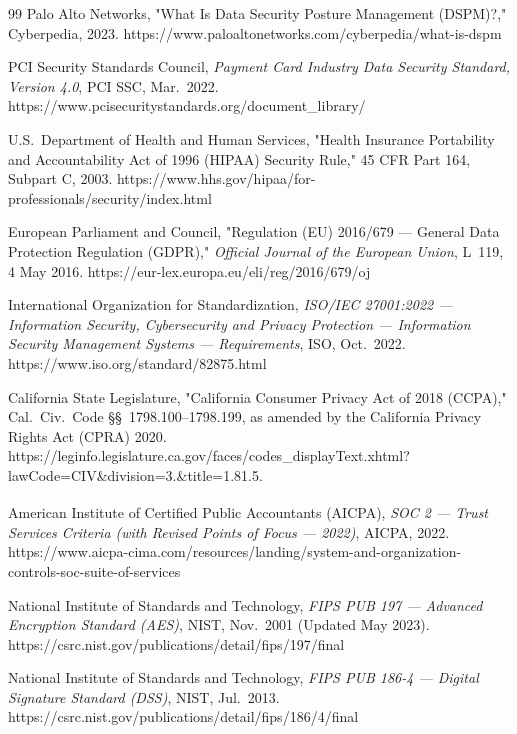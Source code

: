 \documentclass[12pt,a4paper]{report}
\begin{document}
\begin{thebibliography}{99}
Palo Alto Networks, "What Is Data Security Posture Management (DSPM)?," Cyberpedia, 2023. https://www.paloaltonetworks.com/cyberpedia/what-is-dspm


PCI Security Standards Council, \textit{Payment Card Industry Data Security Standard, Version 4.0}, PCI SSC, Mar.\ 2022. https://www.pcisecuritystandards.org/document\_library/

U.S.\ Department of Health and Human Services, "Health Insurance Portability and Accountability Act of 1996 (HIPAA) Security Rule," 45 CFR Part 164, Subpart C, 2003. https://www.hhs.gov/hipaa/for-professionals/security/index.html

European Parliament and Council, "Regulation (EU) 2016/679 --- General Data Protection Regulation (GDPR)," \textit{Official Journal of the European Union}, L~119, 4 May 2016. https://eur-lex.europa.eu/eli/reg/2016/679/oj

International Organization for Standardization, \textit{ISO/IEC 27001:2022 --- Information Security, Cybersecurity and Privacy Protection --- Information Security Management Systems --- Requirements}, ISO, Oct.\ 2022. https://www.iso.org/standard/82875.html

California State Legislature, "California Consumer Privacy Act of 2018 (CCPA)," Cal.\ Civ.\ Code \S\S~1798.100--1798.199, as amended by the California Privacy Rights Act (CPRA) 2020. https://leginfo.legislature.ca.gov/faces/codes\_displayText.xhtml?lawCode=CIV\&division=3.\&title=1.81.5.

American Institute of Certified Public Accountants (AICPA), \textit{SOC 2\textsuperscript{\textregistered} --- Trust Services Criteria (with Revised Points of Focus --- 2022)}, AICPA, 2022. https://www.aicpa-cima.com/resources/landing/system-and-organization-controls-soc-suite-of-services


National Institute of Standards and Technology, \textit{FIPS PUB 197 --- Advanced Encryption Standard (AES)}, NIST, Nov.\ 2001 (Updated May 2023). https://csrc.nist.gov/publications/detail/fips/197/final

National Institute of Standards and Technology, \textit{FIPS PUB 186-4 --- Digital Signature Standard (DSS)}, NIST, Jul.\ 2013. https://csrc.nist.gov/publications/detail/fips/186/4/final


\end{thebibliography}
\end{document}
